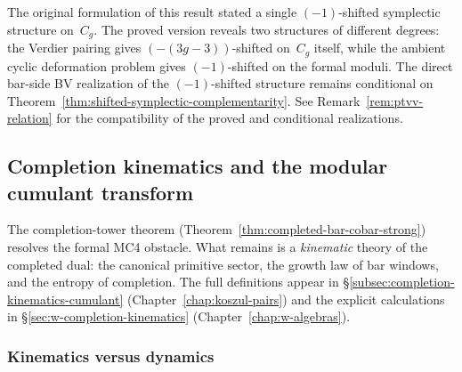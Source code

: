 \begin{remark}\label{rem:lagrangian-conj-scope}
The original formulation of this result stated a single
$(-1)$-shifted symplectic structure on~$C_g$. The proved version
reveals two structures of different degrees: the Verdier pairing
gives $(-(3g{-}3))$-shifted on~$C_g$ itself, while the ambient cyclic
deformation problem gives $(-1)$-shifted on the formal moduli. The
direct bar-side BV realization of the $(-1)$-shifted structure remains
conditional on Theorem~\ref{thm:shifted-symplectic-complementarity}.
See Remark~\ref{rem:ptvv-relation} for the compatibility of the proved
and conditional realizations.
\end{remark}

\subsection{Completion kinematics and the modular cumulant transform}
\label{subsec:completion-kinematics-programme}

The completion-tower theorem
(Theorem~\ref{thm:completed-bar-cobar-strong}) resolves the formal
MC4 obstacle. What remains is a \emph{kinematic} theory of the
completed dual: the canonical primitive sector, the growth law of bar
windows, and the entropy of completion. The full definitions appear in
\S\ref{subsec:completion-kinematics-cumulant}
(Chapter~\ref{chap:koszul-pairs}) and the explicit calculations
in \S\ref{sec:w-completion-kinematics}
(Chapter~\ref{chap:w-algebras}).

\subsubsection*{Kinematics versus dynamics}
\label{sss:kinematics-dynamics}


